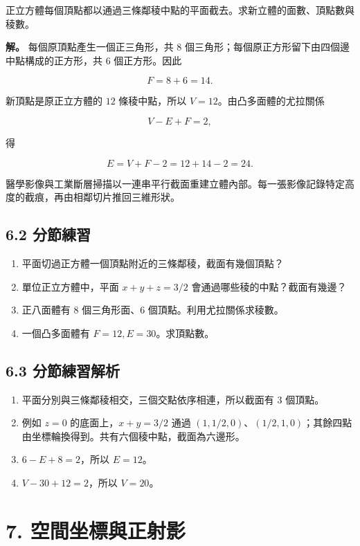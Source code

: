 \documentclass[11pt,a4paper]{article}
\providecommand{\tightlist}{%
  \setlength{\itemsep}{0pt}\setlength{\parskip}{0pt}}
\begin{document}
正立方體每個頂點都以通過三條鄰稜中點的平面截去。求新立體的面數、頂點數與稜數。

\textbf{解。} 每個原頂點產生一個正三角形，共 \(8\) 個三角形；每個原正方形留下由四個邊中點構成的正方形，共 \(6\) 個正方形。因此

\[
F=8+6=14.
\]

新頂點是原正立方體的 \(12\) 條稜中點，所以 \(V=12\)。由凸多面體的尤拉關係

\[
V-E+F=2,
\]

得

\[
E=V+F-2=12+14-2=24.
\]

醫學影像與工業斷層掃描以一連串平行截面重建立體內部。每一張影像記錄特定高度的截痕，再由相鄰切片推回三維形狀。

\subsection{6.2 分節練習}\label{ux5206ux7bc0ux7df4ux7fd2-5}

\begin{enumerate}
\def\labelenumi{\arabic{enumi}.}
\tightlist
\item
  平面切過正方體一個頂點附近的三條鄰稜，截面有幾個頂點？
\item
  單位正立方體中，平面 \(x+y+z=3/2\) 會通過哪些稜的中點？截面有幾邊？
\item
  正八面體有 \(8\) 個三角形面、\(6\) 個頂點。利用尤拉關係求稜數。
\item
  一個凸多面體有 \(F=12,E=30\)。求頂點數。
\end{enumerate}

\subsection{6.3 分節練習解析}\label{ux5206ux7bc0ux7df4ux7fd2ux89e3ux6790-5}

\begin{enumerate}
\def\labelenumi{\arabic{enumi}.}
\tightlist
\item
  平面分別與三條鄰稜相交，三個交點依序相連，所以截面有 \(3\) 個頂點。
\item
  例如 \(z=0\) 的底面上，\(x+y=3/2\) 通過 \((1,1/2,0)\)、\((1/2,1,0)\)；其餘四點由坐標輪換得到。共有六個稜中點，截面為六邊形。
\item
  \(6-E+8=2\)，所以 \(E=12\)。
\item
  \(V-30+12=2\)，所以 \(V=20\)。
\end{enumerate}

\section{7. 空間坐標與正射影}\label{ux7a7aux9593ux5750ux6a19ux8207ux6b63ux5c04ux5f71}
\end{document}
